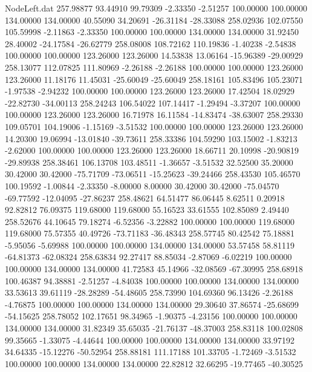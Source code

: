 \begin{filecontents}{NodeLeft.dat}
 257.98877   93.44910   99.79309    -2.33350   -2.51257  100.00000  100.00000  134.00000  134.00000   40.55090   34.20691  -26.31184  -28.33088
 258.02936  102.07550  105.59998    -2.11863   -2.33350  100.00000  100.00000  134.00000  134.00000   31.92450   28.40002  -24.17584  -26.62779
 258.08008  108.72162  110.19836    -1.40238   -2.54838  100.00000  100.00000  123.26000  123.26000   14.53838   13.06164  -15.96389  -29.00929
 258.13077  112.07825  111.80969    -2.26188   -2.26188  100.00000  100.00000  123.26000  123.26000   11.18176   11.45031  -25.60049  -25.60049
 258.18161  105.83496  105.23071    -1.97538   -2.94232  100.00000  100.00000  123.26000  123.26000   17.42504   18.02929  -22.82730  -34.00113
 258.24243  106.54022  107.14417    -1.29494   -3.37207  100.00000  100.00000  123.26000  123.26000   16.71978   16.11584  -14.83474  -38.63007
 258.29330  109.05701  104.19006    -1.15169   -3.51532  100.00000  100.00000  123.26000  123.26000   14.20300   19.06994  -13.01840  -39.73611
 258.33386  104.59290  103.15002    -1.83213   -2.62000  100.00000  100.00000  123.26000  123.26000   18.66711   20.10998  -20.90819  -29.89938
 258.38461  106.13708  103.48511    -1.36657   -3.51532   32.52500   35.20000   30.42000   30.42000  -75.71709  -73.06511  -15.25623  -39.24466
 258.43530  105.46570  100.19592    -1.00844   -2.33350   -8.00000    8.00000   30.42000   30.42000  -75.04570  -69.77592  -12.04095  -27.86237
 258.48621   64.51477   86.06445     8.62511    0.20918   92.82812   76.09375  119.68000  119.68000   55.16523   33.61555  102.85089    2.49440
 258.52676   44.10645   79.18274    -6.52356   -3.22882  100.00000  100.00000  119.68000  119.68000   75.57355   40.49726  -73.71183  -36.48343
 258.57745   80.42542   75.18881    -5.95056   -5.69988  100.00000  100.00000  134.00000  134.00000   53.57458   58.81119  -64.81373  -62.08324
 258.63834   92.27417   88.85034    -2.87069   -6.02219  100.00000  100.00000  134.00000  134.00000   41.72583   45.14966  -32.08569  -67.30995
 258.68918  100.46387   94.38881    -2.51257   -4.84038  100.00000  100.00000  134.00000  134.00000   33.53613   39.61119  -28.28289  -54.48605
 258.73990  104.69360   96.13426    -2.26188   -4.76875  100.00000  100.00000  134.00000  134.00000   29.30640   37.86574  -25.68699  -54.15625
 258.78052  102.17651   98.34965    -1.90375   -4.23156  100.00000  100.00000  134.00000  134.00000   31.82349   35.65035  -21.76137  -48.37003
 258.83118  100.02808   99.35665    -1.33075   -4.44644  100.00000  100.00000  134.00000  134.00000   33.97192   34.64335  -15.12276  -50.52954
 258.88181  111.17188  101.33705    -1.72469   -3.51532  100.00000  100.00000  134.00000  134.00000   22.82812   32.66295  -19.77465  -40.30525

\end{filecontents}
